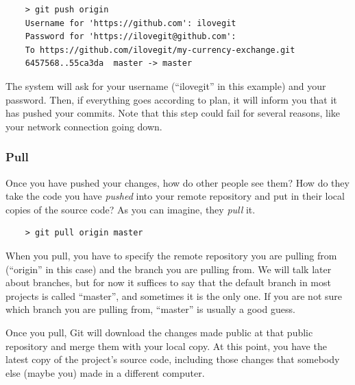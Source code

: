 

\begin{verbatim}
    > git push origin 
    Username for 'https://github.com': ilovegit
    Password for 'https://ilovegit@github.com':
    To https://github.com/ilovegit/my-currency-exchange.git
    6457568..55ca3da  master -> master
\end{verbatim}

The system will ask for your username (``ilovegit'' in this example)
and your password. Then, if everything goes according to plan, 
it will inform you that it has pushed your commits. Note that 
this step could
fail for several reasons, like your network connection going down. 

\subsubsection{Pull}
\label{sec:pull}

Once you have pushed your changes, how do other people see them? How
do they take the code you have \emph{pushed} into your remote
repository and put in their local copies of the source code? As you
can imagine, they \emph{pull} it. 

\begin{verbatim}
    > git pull origin master
\end{verbatim}

When you pull, you have to specify the remote repository you are
pulling from (``origin'' in this case) and the branch you are pulling
from. We will talk later about branches, but for now it suffices to
say that the default branch in most projects is called ``master'', and
sometimes it is the only one. If you are not sure which branch you are
pulling from, ``master'' is usually a good guess.

Once you pull, Git will download the changes made public at that
public repository and merge them with your local copy. At this point,
you have the latest copy of the project's source code, including those
changes that somebody else (maybe you) made in a different computer. 

